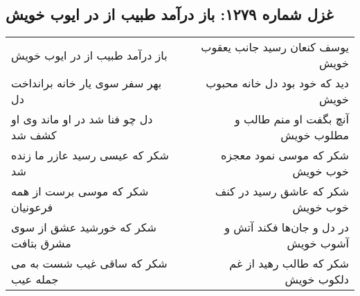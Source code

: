 \begin{center}
\section*{غزل شماره ۱۲۷۹: باز درآمد طبیب از در ایوب خویش}
\label{sec:1279}
\begin{longtable}{l p{0.5cm} r}
باز درآمد طبیب از در ایوب خویش
&&
یوسف کنعان رسید جانب یعقوب خویش
\\
بهر سفر سوی یار خانه برانداخت دل
&&
دید که خود بود دل خانه محبوب خویش
\\
دل چو فنا شد در او ماند وی او کشف شد
&&
آنچ بگفت او منم طالب و مطلوب خویش
\\
شکر که عیسی رسید عازر ما زنده شد
&&
شکر که موسی نمود معجزه خوب خویش
\\
شکر که موسی برست از همه فرعونیان
&&
شکر که عاشق رسید در کنف خوب خویش
\\
شکر که خورشید عشق از سوی مشرق بتافت
&&
در دل و جان‌ها فکند آتش و آشوب خویش
\\
شکر که ساقی غیب شست به می جمله عیب
&&
شکر که طالب رهید از غم دلکوب خویش
\\
\end{longtable}
\end{center}
